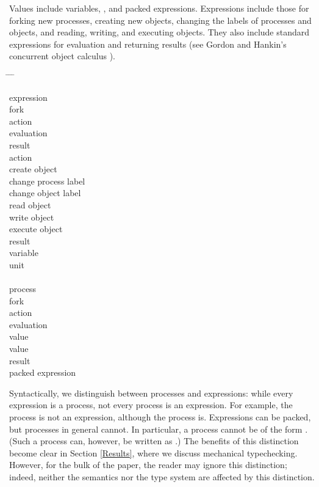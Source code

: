 \documentclass{sigplanconf}
\newenvironment{defn}{\begin{tabbing}
  \hspace{1.5em} \= \hspace{.20\linewidth - 1.5em} \= \hspace{1.5em} \= \kill
  }{
  \end{tabbing}}
\newcommand{\entry}[2]{\>\>\>#2}
\newcommand{\clause}[2]{\>\>#2}
\newcommand{\mycategory}[2]{\clause{#1::=}{#2}}
\newcommand{\labp}{\mathsf P}
\newcommand{\labo}{\mathsf O}
\newcommand{\labb}{\mathsf S}
\newcommand{\fork}[2]{#1\Rsh\:\!#2}
\newcommand{\eval}[3]{\mathsf{let}~#1=#2~\mathsf{in}~#3}
\begin{document}
Values include variables, , and packed expressions. Expressions include those for forking new processes, creating new objects, changing the labels of processes and objects, and reading, writing, and executing objects. 
They also include standard expressions for evaluation and returning
results (see Gordon and Hankin's concurrent object calculus \cite{gordon98concurrent}).  
\begin{defn}
\mycategory{f,g}{expression} \\
\entry{\fork f g}{fork} \\
\entry{t}{action} \\
\entry{\eval x f g}{evaluation} \\
\entry{r}{result} \\
\mycategory{t}{action} \\
\entry{\mathsf{new}(x\mbox{ \# }\labb)}{create object} \\
\entry{[\labp]~a}{change process label} \\
\entry{\langle\labo\rangle~\omega}{change object label}\\
\entry{!\omega}{read object} \\
\entry{\omega := x}{write object} \\
\entry{\mathsf{exec}~\omega}{execute object} \\
\mycategory{r}{result} \\
\entry{x,y,z,\dots,\omega}{variable} \\
\entry{\mathsf{unit}}{unit} \\
\\
\mycategory{a,b}{process} \\
\entry{\fork a b}{fork} \\
\entry{t}{action}  \\
\entry{\eval x a b}{evaluation} \\
\entry{u}{value} \\
\mycategory{u,v}{value} \\
\entry{r}{result} \\
\entry{\mathsf{pack}(f)}{packed expression} 
\end{defn}
Syntactically, we distinguish between processes and expressions: while every expression is a process, not every process is an expression. For example, the process  is not an expression, although the process  is. Expressions can be packed, but processes in general cannot. In particular, a process cannot be of the form . (Such a process can, however, be written as .) The benefits of this distinction become clear in Section \ref{Results}, where we discuss mechanical typechecking. However, for the bulk of the paper, the reader may ignore this distinction; indeed, neither the semantics nor the type system are affected by this distinction. 
\end{document}

